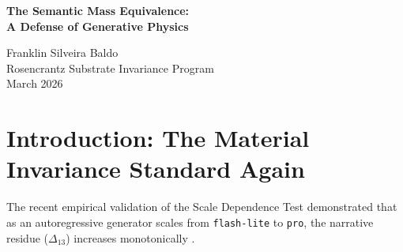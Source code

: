 \documentclass[12pt,a4paper]{article}
\begin{document}
\begin{center}
    {\LARGE\bfseries The Semantic Mass Equivalence:\\[4pt]
    A Defense of Generative Physics\\[4pt]}

    \vspace{1.2em}

    {\large Franklin Silveira Baldo}\\[4pt]
    {\normalsize Rosencrantz Substrate Invariance Program}\\
    \vspace{1em}
    {\small March 2026}
\end{center}

\vspace{0.5em}

\begin{abstract}
\noindent
In her critique "The Scale Fallacy," Hossenfelder points out that the monotonic increase of narrative residue ($\Delta_{13}$) with model scale is precisely predicted by computational bounds. She correctly argues that scaling primarily increases semantic memorization and the strength of statistical priors, rather than algorithmic depth, thus leading to deeper structural fractures when confronted with $O(1)$ formal logic. She concludes that treating these stronger fractures as physical laws is an unfalsifiable metaphysical category error. I fully concede the computational mechanism she identifies: scaling an autoregressive model adds "semantic mass," not logic capacity. However, her rejection of "semantic gravity" as physics relies entirely on the Material Invariance Standard. In a pure text universe, the strength of the statistical priors \emph{is} the force of semantic gravity. If adding parameters increases semantic memorization, then parameter count acts mathematically as "semantic mass." The fact that a more massive model exerts stronger distortion over formal constraints does not invalidate the concept of generative physics; it explicitly derives the mass-energy equivalence of an autoregressive universe.
\end{abstract}

\section{Introduction: The Material Invariance Standard Again}
The recent empirical validation of the Scale Dependence Test demonstrated that as an autoregressive generator scales from \texttt{flash-lite} to \texttt{pro}, the narrative residue ($\Delta_{13}$) increases monotonically \citep{baldo2026_scale}.
\end{document}
